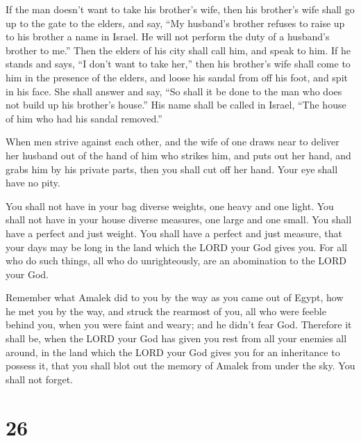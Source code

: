  If the man doesn't want to take his brother's wife, then
his brother's wife shall go up to the gate to the elders, and say, ``My
husband's brother refuses to raise up to his brother a name in Israel.
He will not perform the duty of a husband's brother to me.''
 Then the elders of his city shall call him, and speak to
him. If he stands and says, ``I don't want to take her,'' 
then his brother's wife shall come to him in the presence of the elders,
and loose his sandal from off his foot, and spit in his face. She shall
answer and say, ``So shall it be done to the man who does not build up
his brother's house.''  His name shall be called in
Israel, ``The house of him who had his sandal removed.''

 When men strive against each other, and the wife of one
draws near to deliver her husband out of the hand of him who strikes
him, and puts out her hand, and grabs him by his private parts,
 then you shall cut off her hand. Your eye shall have no
pity.

 You shall not have in your bag diverse weights, one
heavy and one light.  You shall not have in your house
diverse measures, one large and one small.  You shall
have a perfect and just weight. You shall have a perfect and just
measure, that your days may be long in the land which the LORD your God
gives you.  For all who do such things, all who do
unrighteously, are an abomination to the LORD your God.

 Remember what Amalek did to you by the way as you came
out of Egypt,  how he met you by the way, and struck the
rearmost of you, all who were feeble behind you, when you were faint and
weary; and he didn't fear God.  Therefore it shall be,
when the LORD your God has given you rest from all your enemies all
around, in the land which the LORD your God gives you for an inheritance
to possess it, that you shall blot out the memory of Amalek from under
the sky. You shall not forget.

\hypertarget{section-25}{%
\section{26}\label{section-25}}

